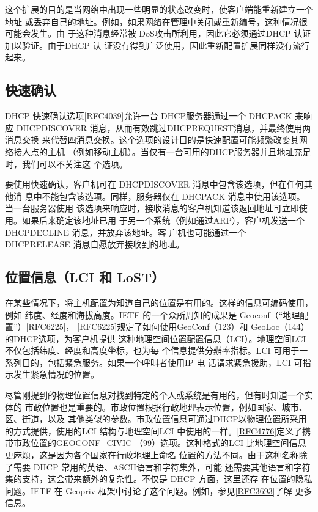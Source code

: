 这个扩展的目的是当网络中出现一些明显的状态改变时，使客户端能重新建立一个地址
或丢弃自己的地址。例如，如果网络在管理中关闭或重新编号，这种情况很可能会发生。由
于这种消息经常被 DoS攻击所利用，因此它必须通过DHCP 认证加以验证。由于DHCP 认
证没有得到广泛使用，因此重新配置扩展同样没有流行起来。

\subsection{快速确认}
DHCP 快速确认选项\href{https://www.rfc-editor.org/rfc/rfc4039}{\href{https://www.rfc-editor.org/rfc/rfc4039}{[RFC4039]}}允许一台 DHCP服务器通过一个 DHCPACK 来响应
DHCPDISCOVER 消息，从而有效跳过DHCPREQUEST消息，并最终使用两消息交换
来代替四消息交换。这个选项的设计目的是快速配置可能频繁改变其网络接人点的主机
（例如移动主机）。当仅有一台可用的DHCP服务器并且地址充足时，我们可以不关注这
个选项。

要使用快速确认，客户机可在 DHCPDISCOVER 消息中包含该选项，但在任何其他消
息中不能包含该选项。同样，服务器仅在 DHCPACK 消息中使用该选项。当一台服务器使用
该选项来响应时，接收消息的客户机知道该返回地址可立即使用。如果后来确定该地址已用
于另一个系统（例如通过ARP），客户机发送一个 DHCPDECLINE 消息，并放弃该地址。客
户机也可能通过一个 DHCPRELEASE 消息自愿放弃接收到的地址。

\subsection{位置信息（LCI 和 LoST）}

在某些情况下，将主机配置为知道自己的位置是有用的。这样的信息可编码使用，例如
纬度、经度和海拔高度。IETF 的一个众所周知的成果是 Geoconf（“地理配置”）\href{https://www.rfc-editor.org/rfc/rfc6225}{\href{https://www.rfc-editor.org/rfc/rfc6225}{[RFC6225]}}，
\href{https://www.rfc-editor.org/rfc/rfc6225}{\href{https://www.rfc-editor.org/rfc/rfc6225}{[RFC6225]}}规定了如何使用GeoConf（123）和 GeoLoc（144）的DHCP选项，为客户机提供
这种地理空间位置配置信息（LCI）。地理空间LCI 不仅包括纬度、经度和高度坐标，也为每
个信息提供分辦率指标。LCI 可用于一系列目的，包括紧急服务。如果一个呼叫者使用IP 电
话请求紧急援助，LCI 可指示发生紧急情况的位置。

尽管刚提到的物理位置信息对找到特定的个人或系统是有用的，但有时知道一个实体的
市政位置也是重要的。市政位置根据行政地理表示位置，例如国家、城市、区、街道，以及
其他类似的参数。市政位置信息可通过DHCP以物理位置所采用的方式提供，使用的LCI
结构与地理空间LCI 中使用的一样。\href{https://www.rfc-editor.org/rfc/rfc4776}{\href{https://www.rfc-editor.org/rfc/rfc4776}{[RFC4776]}}定义了携带市政位置的GEOCONF\_CIVIC
（99）选项。这种格式的LCI 比地理空间信息更麻烦，这是因为各个国家在行政地理上命名
位置的方法不同。由于这种名称除了需要 DHCP 常用的英语、ASCII语言和字符集外，可能
还需要其他语言和字符集的支持，这会带来额外的复杂性。不仅是 DHCP 方面，这里还存
在位置的隐私问题。IETF 在 Geopriv 框架中讨论了这个问题。例如，参见\href{https://www.rfc-editor.org/rfc/rfc3693}{\href{https://www.rfc-editor.org/rfc/rfc3693}{[RFC3693]}}了解
更多信息。

